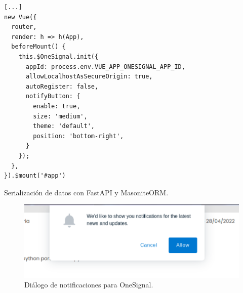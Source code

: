 \begin{listing}
\begin{verbatim}
[...]
new Vue({
  router,
  render: h => h(App),
  beforeMount() {
    this.$OneSignal.init({
      appId: process.env.VUE_APP_ONESIGNAL_APP_ID,
      allowLocalhostAsSecureOrigin: true,
      autoRegister: false,
      notifyButton: {
        enable: true,
        size: 'medium',
        theme: 'default',
        position: 'bottom-right',
      }
    });
  },
}).$mount('#app')
\end{verbatim}
\caption{Serialización de datos con FastAPI y MasoniteORM.}
\label{lst:onesignal-configuration}
\end{listing}

\begin{figure}[!ht]
	\centering
	\includegraphics[width=0.7\linewidth]{images/screenshots/2.0.1-onesignal-notifications.png}
	\caption{Diálogo de notificaciones para OneSignal.}
	\label{fig:onesignal-notifications-dialog}
\end{figure}
